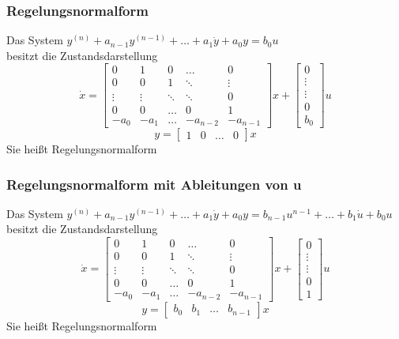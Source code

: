 \documentclass[10pt,a4paper]{article}
\newcommand{\vect}[1]{\ensuremath{\begin{bmatrix}#1\end{bmatrix}}}
\begin{document}
\subsubsection{Regelungsnormalform}
Das System $y^{(n)} + a_{n-1} y^{(n-1)} + \dots + a_1 \dot y + a_0 y = b_0 u$ \\
besitzt die Zustandsdarstellung
$$
	\dot x = \begin{bmatrix}
		0 & 1 & 0 & \dots & 0 \\
		0 & 0 & 1 & \ddots & \vdots \\
		\vdots & \vdots & \ddots & \ddots & 0 \\
		0 & 0 & \dots & 0 & 1 \\
		-a_0 & -a_1 & \dots & -a_{n-2} & -a_{n-1}
	\end{bmatrix} x + \vect{0 \\ \vdots \\ \vdots \\ 0 \\ b_0} u
$$
$$
	y = \vect{1 & 0 & \dots & 0} x
$$
Sie heißt Regelungsnormalform

\subsubsection{Regelungsnormalform mit Ableitungen von u}

Das System $y^{(n)} + a_{n-1} y^{(n-1)} + \dots + a_1 \dot y + a_0 y = b_{n-1} u^{n-1} + \dots + b_1 \dot u + b_0 u$ \\
besitzt die Zustandsdarstellung
$$
\dot x = \begin{bmatrix}
0 & 1 & 0 & \dots & 0 \\
0 & 0 & 1 & \ddots & \vdots \\
\vdots & \vdots & \ddots & \ddots & 0 \\
0 & 0 & \dots & 0 & 1 \\
-a_0 & -a_1 & \dots & -a_{n-2} & -a_{n-1}
\end{bmatrix} x + \vect{0 \\ \vdots \\ \vdots \\ 0 \\ 1} u
$$
$$
y = \vect{b_0 & b_1 & \dots & b_{n-1}} x
$$
Sie heißt Regelungsnormalform
\end{document}
